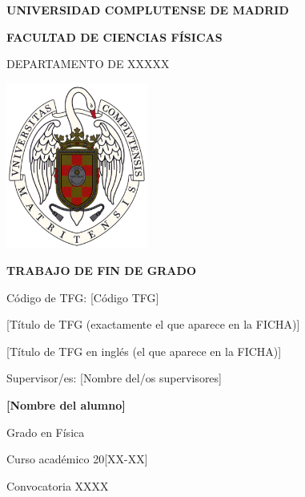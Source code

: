 \documentclass[11pt, a4paper]{article} %
\begin{document}

\begin{titlepage}
\centering
{ \bfseries \Large UNIVERSIDAD COMPLUTENSE DE MADRID}
\vspace{0.5cm}

{\bfseries  \Large FACULTAD DE CIENCIAS FÍSICAS} 
\vspace{1cm}

{\large DEPARTAMENTO DE XXXXX}
\vspace{0.8cm}

{\includegraphics[width=0.35\textwidth]{logo_UCM}} %
\vspace{0.8cm}

{\bfseries \Large TRABAJO DE FIN DE GRADO}
\vspace{2cm}

{\Large Código de TFG:  [C\'odigo TFG] } \vspace{5mm}

{\Large [Título de TFG (exactamente el que aparece en la FICHA)]}\vspace{5mm}

{\Large [Título de TFG en ingl\'es (el que aparece en la FICHA)]}\vspace{5mm}

{\Large Supervisor/es: [Nombre del/os supervisores]}\vspace{20mm} 

{\bfseries \LARGE [Nombre del alumno]}\vspace{5mm} 

{\large Grado en Física}\vspace{5mm} 

{\large Curso acad\'emico 20[XX-XX]}\vspace{5mm} 

{\large Convocatoria XXXX}\vspace{5mm} 

\end{titlepage}
\end{document}
